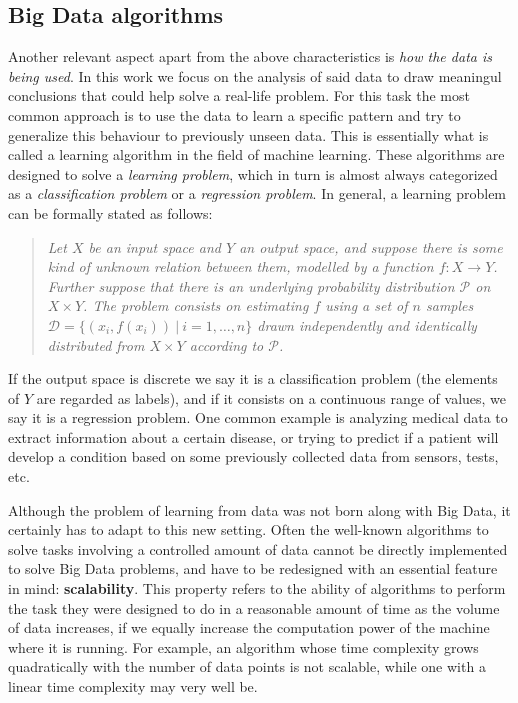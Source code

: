 \subsection{Big Data algorithms}

Another relevant aspect apart from the above characteristics is \textit{how the data is being used}. In this work we focus on the analysis of said data to draw meaningul conclusions that could help solve a real-life problem. For this task the most common approach is to use the data to learn a specific pattern and try to generalize this behaviour to previously unseen data. This is essentially what is called a learning algorithm in the field of machine learning. These algorithms are designed to solve a \textit{learning problem}, which in turn is almost always categorized as a \textit{classification problem} or a \textit{regression problem}.
In general, a learning problem can be formally stated as follows:

\begin{quotation}
  \itshape \noindent
  Let $X$ be an input space and $Y$ an output space, and suppose there is some kind of unknown relation between them, modelled by a function $f:X\to Y$. Further suppose that there is an underlying probability distribution $\mathcal P$ on $X \times Y$. The problem consists on estimating $f$ using a set of $n$ samples $\mathcal D = \{ (x_i, f(x_i)) \ | \ i = 1,\dots,n \}$ drawn independently and identically distributed from $X \times Y$ according to $\mathcal P$.
\end{quotation}
If the output space is discrete we say it is a classification problem (the elements of $Y$ are regarded as labels), and if it consists on a continuous range of values, we say it is a regression problem. One common example is analyzing medical data to extract information about a certain disease, or trying to predict if a patient will develop a condition based on some previously collected data from sensors, tests, etc.

Although the problem of learning from data was not born along with Big Data, it certainly has to adapt to this new setting. Often the well-known algorithms to solve tasks involving a controlled amount of data cannot be directly implemented to solve Big Data problems, and have to be redesigned with an essential feature in mind: \textbf{scalability}. This property refers to the ability of algorithms to perform the task they were designed to do in a reasonable amount of time as the volume of data increases, if we equally increase the computation power of the machine where it is running. For example, an algorithm whose time complexity grows quadratically with the number of data points is not scalable, while one with a linear time complexity may very well be.

